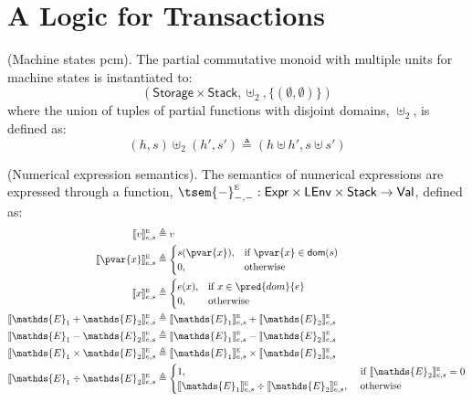 \section{A Logic for Transactions}

\begin{defn}
	(Machine states pcm).
	The partial commutative monoid with multiple units for machine states is instantiated to:
	\[
		(\mathsf{Storage} \times \mathsf{Stack}, \uplus_2, \{ (\emptyset, \emptyset) \})
	\]
	where the union of tuples of partial functions with disjoint domains, $\uplus_2$, is defined as:
	\[
		(h, s) \uplus_2 (h', s') \triangleq (h \uplus h', s \uplus s')
	\]
\end{defn}

\begin{defn}
	(Numerical expression semantics).
	The semantics of numerical expressions are expressed through a function, $\tsem{-}_{-,-}^\textsc{e} : \mathsf{Expr} \times \mathsf{LEnv} \times \mathsf{Stack} \rightarrow \mathsf{Val}$, defined as:
	\begin{align*}
		\llbracket v \rrbracket^\textsc{e}_{e, s} &\triangleq v \\
		\llbracket \pvar{x} \rrbracket^\textsc{e}_{e, s} &\triangleq
		\begin{cases}
		s(\pvar{x}), &\text{if } \pvar{x} \in \textsf{dom}(s)\\
		0,&\text{otherwise}
		\end{cases} \\
		\llbracket x \rrbracket^\textsc{e}_{e, s} &\triangleq \begin{cases}
			e(x), & \text{if } x \in \pred{dom}{e} \\
			0, & \text{otherwise}
		\end{cases} \\
		\llbracket \mathds{E}_1 + \mathds{E}_2 \rrbracket^\textsc{e}_{e, s} &\triangleq \llbracket \mathds{E}_1 \rrbracket^\textsc{e}_{e, s} + \llbracket \mathds{E}_2 \rrbracket^\textsc{e}_{e, s} \\
		\llbracket \mathds{E}_1 - \mathds{E}_2 \rrbracket^\textsc{e}_{e, s} &\triangleq \llbracket \mathds{E}_1 \rrbracket^\textsc{e}_{e, s} - \llbracket \mathds{E}_2 \rrbracket^\textsc{e}_{e, s} \\
		\llbracket \mathds{E}_1 \times \mathds{E}_2 \rrbracket^\textsc{e}_{e, s} &\triangleq \llbracket \mathds{E}_1 \rrbracket^\textsc{e}_{e, s} \times \llbracket \mathds{E}_2 \rrbracket^\textsc{e}_{e, s} \\
		\llbracket \mathds{E}_1 \div \mathds{E}_2 \rrbracket^\textsc{e}_{e, s} &\triangleq 
		\begin{cases}
		1, &\text{ if } \llbracket \mathds{E}_2 \rrbracket^\textsc{e}_{e, s} = 0 \\
		\llbracket \mathds{E}_1 \rrbracket^\textsc{e}_{e, s} \div \llbracket \mathds{E}_2 \rrbracket^\textsc{e}_{e, s}, &\text{ otherwise} \\
		\end{cases}
	\end{align*}
\end{defn}
